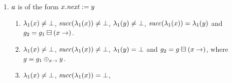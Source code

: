 {\begin{enumerate}
\begin{enumerate}
\begin{enumerate}
    $\labeling_1(\yvar)\neq\labeling_1(\nil)$, %
    $\suc(\labeling_1(\yvar))=\undef$ and
    $\graph_2=\graph\delVar{\xvar}$, where
    $\graph=\graph_1\addEdgeBetween{\yvar}{\xvar}$.
  \item \label{pre:case:assignedDotNextC}%
    $\labeling_1(\xvar)\neq\undef$, %
    $\labeling_1(\yvar)=\undef$ %
    and there are graphs $\graph,\graph'$ such that
    $\graph_2=\graph'\delVar{\xvar}$, %
    $\graph'=\graph\addEdgeBetween{\yvar}{\xvar}$ and %
    $\graph=\graph_1\addVarAsPredOf{\xvar}{\yvar}$.
  \item \label{pre:case:assignedDotNextD}%
    $\labeling_1(\xvar)=\undef$, %
    $\labeling_1(\yvar)\neq\undef$, %
    $\suc(\labeling_1(\yvar))\neq\undef$ and %
    $\graph_2=\graph_1$.
  \item \label{pre:case:assignedDotNextE}%
    $\labeling_1(\xvar)=\undef$, %
    $\labeling_1(\yvar)\neq\undef$, %
    $\labeling_1(\yvar)\neq\labeling_1(\nil)$, %
    $\suc(\labeling_1(\yvar))=\undef$ and %
    $\graph_2=\graph_1\addEdge{\yvar}$.
  \item \label{pre:case:assignedDotNextF}%
    $\labeling_1(\xvar)=\undef$, %
    $\labeling_1(\yvar)=\undef$ %
    there are graphs $\graph,\graph',\graph_3$ such that
    $\graph\equals\graph_1\addVar{\xvar}$, %
    $\graph'\in\graph\addVarAsPredOf{\xvar}{\yvar}$, %
    $\graph_3\equals\graph'\addEdgeBetween{\yvar}{\xvar}$ and %
    $\graph_2=\graph_3\delVar{\xvar}$.
    Observe that \xvar\ just serves here as a temporary variable.
  \end{enumerate}
\item $a$ is of the form $x.{\it next}:=y$
  \begin{enumerate}
  \item \label{pre:case:dotNextAssignedA}%
    $\labeling_1(\xvar)\neq\undef$, %
    ${\it succ}(\lambda_1(x))\neq\bot$, %
    $\labeling_1(\yvar)\neq\undef$, %
    ${\it succ}(\lambda_1(x))=\lambda_1(y)$ and
    $g_2=g_1\boxminus({x}\rightarrow)$.
  \item \label{pre:case:dotNextAssignedB}%
    $\labeling_1(\xvar)\neq\undef$, %
    ${\it succ}(\lambda_1(x))\neq\bot$, %
    $\labeling_1(\yvar)=\undef$ and %
    $g_2=g\boxminus({x}\rightarrow)$, %
    where $g=g_1\oplus_{{x}\rightarrow}{y}$.
  \item \label{pre:case:dotNextAssignedC}%
    $\labeling_1(\xvar)\neq\undef$, %
    ${\it succ}(\lambda_1(x))=\bot$, %

\end{enumerate}
\end{enumerate}
\end{enumerate}}
